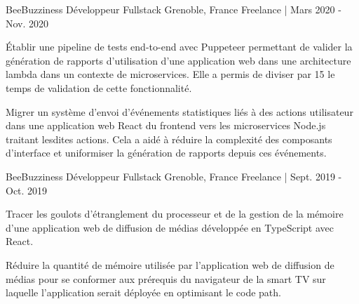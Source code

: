 

\begin{cventries}

  \cventry
  	{BeeBuzziness} %
    {Développeur Fullstack} %
    {Grenoble, France} %
    {Freelance | Mars 2020 - Nov. 2020} %
    {
      \begin{cvitems} %
        \item {Établir une pipeline de tests end-to-end avec Puppeteer permettant de valider la génération de rapports d'utilisation d'une application web dans une architecture lambda dans un contexte de microservices.  
        Elle a permis de diviser par 15 le temps de validation de cette fonctionnalité.}
        \item {Migrer un système d'envoi d'événements statistiques liés à des actions utilisateur dans une application web React du frontend vers les microservices Node.js traitant lesdites actions.
        Cela a aidé à réduire la complexité des composants d'interface et uniformiser la génération de rapports depuis ces événements.}
      \end{cvitems}
    }

  \cventry
  	{BeeBuzziness} %
    {Développeur Fullstack} %
    {Grenoble, France} %
    {Freelance | Sept. 2019 - Oct. 2019} %
    {
      \begin{cvitems} %
        \item {Tracer les goulots d'étranglement du processeur et de la gestion de la mémoire d'une application web de diffusion de médias développée en TypeScript avec React.}
        \item {Réduire la quantité de mémoire utilisée par l'application web de diffusion de médias pour se conformer aux prérequis du navigateur de la smart TV sur laquelle l'application serait déployée en optimisant le code path.}
      \end{cvitems}
    }


\end{cventries}
